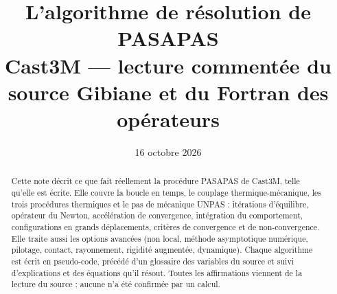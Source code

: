 \documentclass[11pt,a4paper]{article}
\title{\sffamily\bfseries L'algorithme de résolution de PASAPAS\\[0.3em]
  \large\mdseries Cast3M — lecture commentée du source Gibiane et du Fortran des opérateurs}
\author{}
\date{16 octobre 2026}
\numberwithin{equation}{section}
\newcommand{\pr}[1]{\textsf{#1}}                        %
\begin{document}
\maketitle
\thispagestyle{empty}

\begin{abstract}
\noindent Cette note décrit ce que fait réellement la procédure \pr{PASAPAS} de Cast3M, telle qu'elle est écrite.
Elle couvre la boucle en temps, le couplage thermique-mécanique, les trois procédures thermiques et le pas de mécanique \pr{UNPAS} : itérations d'équilibre, opérateur du Newton, accélération de convergence, intégration du comportement, configurations en grands déplacements, critères de convergence et de non-convergence.
Elle traite aussi les options avancées (non local, méthode asymptotique numérique, pilotage, contact, rayonnement, rigidité augmentée, dynamique).
Chaque algorithme est écrit en pseudo-code, précédé d'un glossaire des variables du source et suivi d'explications et des équations qu'il résout.
Toutes les affirmations viennent de la lecture du source ; aucune n'a été confirmée par un calcul.
\end{abstract}

\setcounter{tocdepth}{2}
\tableofcontents
\clearpage
\end{document}
